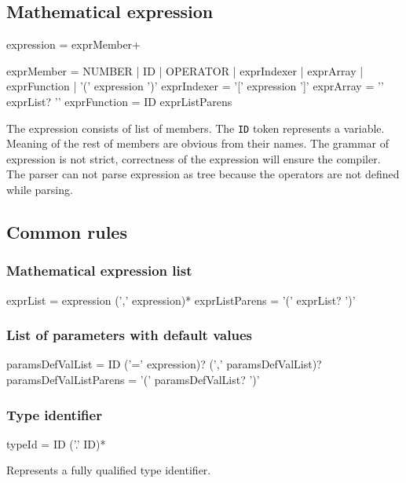 \subsection{Mathematical expression}

\begin{Grammar}
expression = exprMember+

exprMember = NUMBER
	| ID
	| OPERATOR
	| exprIndexer
	| exprArray
	| exprFunction
	| '(' expression ')'
exprIndexer = '[' expression ']'
exprArray = '{' exprList? '}'
exprFunction = ID exprListParens
\end{Grammar}

The expression consists of list of members.
The \texttt{ID} token represents a variable.
Meaning of the rest of members are obvious from their names.
The grammar of expression is not strict, correctness of the expression will ensure the compiler.
The parser can not parse expression as tree because the operators are not defined while parsing.



\subsection{Common rules}

\subsubsection{Mathematical expression list}
\begin{Grammar}
exprList = expression (',' expression)*
exprListParens = '(' exprList? ')'
\end{Grammar}


\subsubsection{List of parameters with default values}
\begin{Grammar}
paramsDefValList = ID ('=' expression)?  (',' paramsDefValList)?
paramsDefValListParens = '(' paramsDefValList? ')'
\end{Grammar}


\subsubsection{Type identifier}
\begin{Grammar}
typeId = ID ('.' ID)*
\end{Grammar}

Represents a fully qualified type identifier.









